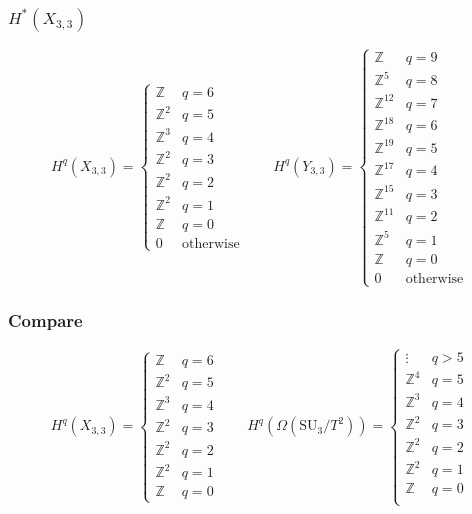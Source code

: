 \documentclass{beamer} %
\newcommand{\Z}{\mathbb{Z}}
\newcommand{\SU}{\mathrm{SU}}
\begin{document}
\begin{frame}
  \frametitle{$H^*(X_{3,3})$}
  \[ H^q(X_{3,3}) =
  \begin{cases}
    \Z & q=6 \\
    \Z^{2} & q=5 \\
    \Z^{3} & q=4 \\
    \Z^{2} & q=3 \\
    \Z^{2} & q=2 \\
    \Z^{2} & q=1 \\
    \Z & q = 0 \\
    0 & \text{otherwise}
  \end{cases}
  \qquad 
  H^q(Y_{3,3}) =
  \begin{cases}
    \Z & q = 9\\
    \Z^{5} & q = 8\\
    \Z^{12} & q = 7\\
    \Z^{18} & q = 6\\
    \Z^{19} & q = 5\\
    \Z^{17} & q = 4\\
    \Z^{15} & q = 3\\
    \Z^{11} & q = 2\\
    \Z^{5} & q = 1\\
    \Z & q = 0 \\
    0 & \text{otherwise}
  \end{cases} \]
\end{frame}

\begin{frame}
  \frametitle{Compare}
  \[ H^q(X_{3,3}) =
  \begin{cases}
    \Z & q=6 \\
    \Z^{2} & q=5 \\
    \Z^{3} & q=4 \\
    \Z^{2} & q=3 \\
    \Z^{2} & q=2 \\
    \Z^{2} & q=1 \\
    \Z & q = 0
  \end{cases}
  \qquad 
  H^q(\Omega(\SU_3/T^2)) =
  \begin{cases}
    \vdots & q > 5 \\
    \Z^4 & q = 5 \\
    \Z^3 & q = 4 \\
    \Z^2 & q = 3 \\
    \Z^2 & q = 2 \\
    \Z^2 & q = 1 \\
    \Z & q = 0 \\
  \end{cases} \]
\end{frame}
\end{document}
